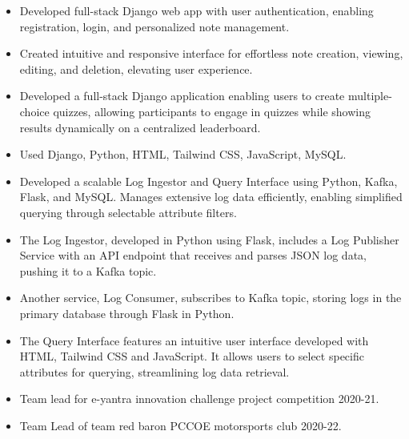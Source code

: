 \smallskip
{}


\smallskip
{}
\smallskip
\begin{itemize}
\item Developed full-stack Django web app with user authentication, enabling registration, login, and personalized note management.
\smallskip
\item Created intuitive and responsive interface for effortless note creation, viewing, editing, and deletion, elevating user experience.
\end{itemize}
\smallskip
\smallskip
{}
\smallskip
\begin{itemize}
\item Developed a full-stack Django application enabling users to create multiple-choice quizzes, allowing participants to engage in quizzes while showing results dynamically on a centralized leaderboard.
\smallskip
\item Used Django, Python, HTML, Tailwind CSS, JavaScript, MySQL.
\end{itemize}
\smallskip
\smallskip
{}
\smallskip
\begin{itemize}
\item Developed a scalable Log Ingestor and Query Interface using Python, Kafka, Flask, and MySQL. Manages extensive log data efficiently, enabling simplified querying through selectable attribute filters.
\smallskip
\item The Log Ingestor, developed in Python using Flask, includes a Log Publisher Service with an API endpoint that receives and parses JSON log data, pushing it to a Kafka topic.
\smallskip
\item  Another service, Log Consumer, subscribes to Kafka topic, storing logs in the primary database through Flask in Python.
\smallskip
\item The Query Interface features an intuitive user interface developed with HTML, Tailwind CSS and JavaScript. It allows users to select specific attributes for querying, streamlining log data retrieval.
\end{itemize}
\cvproject{}

\smallskip
\begin{itemize}
\item Team lead for e-yantra innovation challenge project competition 2020-21.
\smallskip
\item Team Lead of team red baron PCCOE motorsports club 2020-22.
\end{itemize}